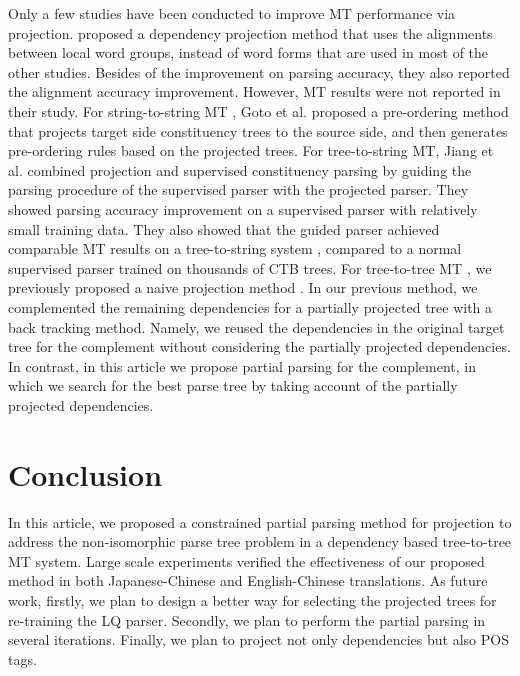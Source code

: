 \documentclass[english]{jnlp_1.4}
\begin{document}
Only a few studies have been conducted to improve MT performance via projection.
 proposed a dependency projection method that uses the 
alignments between local word groups, instead of word forms that are used in most of the other studies. 
Besides of the improvement on parsing accuracy, they also reported the alignment accuracy improvement.
However, MT results were not reported in their study.
For string-to-string MT \cite{koehn-EtAl:2007:PosterDemo}, Goto et al. \citeyear{Goto:2015:PUT:2791399.2699925} 
proposed a pre-ordering method that projects target side constituency trees to the source side, and then
generates pre-ordering rules based on the projected trees.
For tree-to-string MT, Jiang et al. \citeyear{jiang-EtAl:2010:POSTERS} combined projection and supervised
constituency parsing by guiding the parsing procedure of the supervised parser with the projected parser. They showed 
parsing accuracy improvement on a supervised parser with relatively small training data. They also showed 
that the guided parser achieved comparable MT results on a tree-to-string system \cite{liu-liu-lin:2006:COLACL}, 
compared to a normal supervised parser trained on thousands of CTB trees.
For tree-to-tree MT \cite{richardson-EtAl:2015:WAT}, we previously proposed a naive projection method 
\cite{Shen2015a}. In our previous method, we complemented the remaining dependencies for a partially 
projected tree with a back tracking method. Namely, we reused the dependencies in the original target tree 
for the complement without considering the partially projected dependencies. In contrast, in this article we 
propose partial parsing for the complement, in which we search for the best parse tree by taking account of 
the partially projected dependencies.


\section{Conclusion}

In this article, we proposed a constrained partial parsing method for projection to address the non-isomorphic
parse tree problem in a dependency based tree-to-tree MT system. {Large scale experiments} verified the effectiveness of
our proposed method in both Japanese-Chinese and English-Chinese translations. 
As future work, firstly, we plan to design a better way for selecting the projected trees for re-training the 
LQ parser. Secondly, we plan to perform the partial parsing in several iterations.
Finally, we plan to project not only dependencies but also POS tags.
\end{document}
